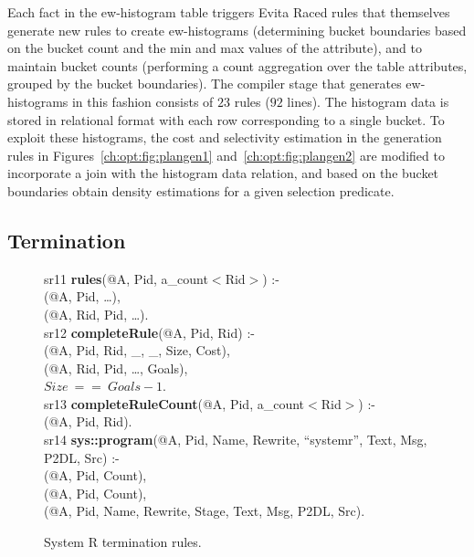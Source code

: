 Each fact in the ew-histogram table triggers Evita Raced rules that themselves
generate new rules to create ew-histograms (determining bucket boundaries based
on the bucket count and the min and max values of the attribute), and to
maintain bucket counts (performing a count aggregation over the table
attributes, grouped by the bucket boundaries).  The compiler stage that
generates ew-histograms in this fashion consists of $23$ rules ($92$ lines).
The histogram data is stored in relational format with each row corresponding
to a single bucket.  To exploit these histograms, the cost and selectivity
estimation in the  generation rules in
Figures~\ref{ch:opt:fig:plangen1} and~\ref{ch:opt:fig:plangen2} are modified to
incorporate a join with the histogram data relation, and based on the bucket
boundaries obtain density estimations for a given selection predicate.

\subsection{Termination}
\label{ch:opt:sec:termination}

\begin{figure*}
\ssp
\centering
\begin{boxedminipage}{\linewidth}
sr11 {\bf rules}(@A, Pid, a\_count$<$Rid$>$) :-\\
(@A, Pid, \ldots), \\
(@A, Rid, Pid, \ldots). \\

sr12 {\bf completeRule}(@A, Pid, Rid) :- \\
(@A, Pid, Rid, \_, \_, Size, Cost), \\
(@A, Rid, Pid, \ldots, Goals), \\
\datalogspace $Size\ ==\ Goals - 1$. \\

sr13 {\bf completeRuleCount}(@A, Pid, a\_count$<$Rid$>$) :- \\
(@A, Pid, Rid). \\

sr14 {\bf sys::program}(@A, Pid, Name, Rewrite, ``systemr'', Text, Msg, P2DL, Src) :- \\
(@A, Pid, Count), \\
(@A, Pid, Count), \\
(@A, Pid, Name, Rewrite, Stage, Text, Msg, P2DL, Src).

\end{boxedminipage}
\caption{\label{ch:opt:fig:systemrend}System R termination rules.}
\end{figure*}

